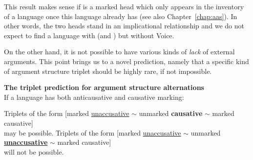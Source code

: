 \begin{exe}
\begin{xlist}
\begin{xlist}
\begin{exe}
\begin{exe}
\begin{xlist}
\begin{exe}
\begin{xlist}
\begin{exe}
\begin{xlist}
\begin{xlist}
\begin{exe}
\begin{xlist}
\begin{exe}
\begin{xlist}
\begin{exe}
\begin{exe}
\begin{exe}
\begin{xlist}
\begin{exe}
\begin{exe}
\begin{xlist}
\begin{xlist}
\begin{exe}
\begin{xlist}
\begin{exe}
\begin{exe}
\begin{exe}
\begin{xlist}
\begin{exe}
\begin{exe}
\begin{xlist}
\begin{exe}
\begin{xlist}
\begin{exe}
\begin{xlist}
\begin{exe}
\begin{xlist}
\begin{exe}
\begin{exe}
\begin{xlist}
\begin{exe}
\begin{exe}
\begin{xlist}
\begin{xlist}
\begin{exe}
\begin{xlist}
\begin{xlist}
\begin{exe}
\begin{xlist}
\begin{exe}
\begin{xlist}
\begin{exe}
\begin{xlist}
\begin{exe}
\begin{xlist}
\begin{exe}
\begin{exe}
\begin{exe}
This result makes sense if {\vd} is a marked head which only appears in the inventory of a language once this language already has  (see also Chapter~\ref{chap:aas}). In other words, the two heads stand in an implicational relationship and we do not expect to find a language with {\vd} (and {\vz}) but without Voice.

On the other hand, it is not possible to have various kinds of \emph{lack} of external arguments. This point brings us to a novel prediction, namely that a specific kind of argument structure triplet should be highly rare, if not impossible.
 \begin{exe}
 \ex  \label{ex:vd:causpred}\textbf{The triplet prediction for argument structure alternations} \\
 	If a language has both anticausative and causative marking:
 \begin{xlist} 
 	\ex  Triplets of the form 
		{[}marked \underline{unaccusative} $\sim$ unmarked \textbf{causative} $\sim$ marked causative] \\
		may be possible.
 	\ex  Triplets of the form 
	 	{[}marked \underline{unaccusative} $\sim$ unmarked \textbf{\underline{unaccusative}} $\sim$ marked causative] \\
	 	will not be possible.
 \z
\z 	


\end{xlist}
\end{exe}
\end{exe}
\end{exe}
\end{exe}
\end{xlist}
\end{exe}
\end{xlist}
\end{exe}
\end{xlist}
\end{exe}
\end{xlist}
\end{exe}
\end{xlist}
\end{xlist}
\end{exe}
\end{xlist}
\end{xlist}
\end{exe}
\end{exe}
\end{xlist}
\end{exe}
\end{exe}
\end{xlist}
\end{exe}
\end{xlist}
\end{exe}
\end{xlist}
\end{exe}
\end{xlist}
\end{exe}
\end{exe}
\end{xlist}
\end{exe}
\end{exe}
\end{exe}
\end{xlist}
\end{exe}
\end{xlist}
\end{xlist}
\end{exe}
\end{exe}
\end{xlist}
\end{exe}
\end{exe}
\end{exe}
\end{xlist}
\end{exe}
\end{xlist}
\end{exe}
\end{xlist}
\end{xlist}
\end{exe}
\end{xlist}
\end{exe}
\end{xlist}
\end{exe}
\end{exe}
\end{xlist}
\end{xlist}
\end{exe}
